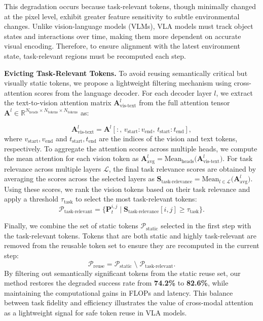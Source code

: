 This degradation occurs because task-relevant tokens, though minimally changed at the pixel level, exhibit greater feature sensitivity to subtle environmental changes. Unlike vision-language models (VLMs), VLA models must track object states and interactions over time, making them more dependent on accurate visual encoding. Therefore, to ensure alignment with the latest environment state, task-relevant regions must be recomputed each step.


\textbf{Evicting Task-Relevant Tokens.}
To avoid reusing semantically critical but visually static tokens, we propose a lightweight filtering mechanism using cross-attention scores from the language decoder. For each decoder layer \(l\), we extract the text-to-vision attention matrix \(\mathbf{A}^l_{\text{vis-text}}\) from the full attention tensor \(\mathbf{A}^l \in \mathbb{R}^{N_{\text{heads}} \times N_{\text{tokens}} \times N_{\text{tokens}}}\) as:

\begin{equation}
\label{eq:avistext}
\mathbf{A}^l_{\text{vis-text}} 
= \mathbf{A}^l[:,\, v_{\text{start}} : v_{\text{end}},\, t_{\text{start}} : t_{\text{end}}],
\end{equation}
where \( v_{\text{start}}, v_{\text{end}} \) and \( t_{\text{start}}, t_{\text{end}} \) are the indices of the vision and text tokens, respectively. To aggregate the attention scores across multiple heads, we compute the mean attention for each vision token as $\mathbf{A}^l_{\text{avg}} 
= \mathrm{Mean}_{\text{heads}}\!\bigl(\mathbf{A}^l_{\text{vis-text}}\bigr)$. For task relevance across multiple layers \( \mathcal{L} \), the final task relevance scores are obtained by averaging the scores across the selected layers as $\mathbf{S}_{\text{task-relevance}} 
= \mathrm{Mean}_{l \in \mathcal{L}}\!\bigl(\mathbf{A}^l_{\text{avg}}\bigr)$.
Using these scores, we rank the vision tokens based on their task relevance and apply a threshold \( \tau_{\text{task}} \) to select the most task-relevant tokens:
\begin{equation}
\label{eq:ptask}
\mathcal{P}_{\text{task-relevant}} 
= \{ \mathbf{P}_t^{i,j} \mid \mathbf{S}_{\text{task-relevance}}[i,j] \geq \tau_{\text{task}} \}.
\end{equation}

Finally, we combine the set of static tokens \( \mathcal{P}_{\mathrm{static}} \) selected in the first step with the task-relevant tokens. Tokens that are both static and highly task-relevant are removed from the reusable token set to ensure they are recomputed in the current step:
\begin{equation}
\label{eq:pfinal}
\mathcal{P}_{\mathrm{reuse}} 
= \mathcal{P}_{\mathrm{static}} \;\setminus\; \mathcal{P}_{\text{task-relevant}}.
\end{equation}
By filtering out semantically significant tokens from the static reuse set, our method restores the degraded success rate from \textbf{74.2\%} to \textbf{82.6\%}, while maintaining the computational gains in FLOPs and latency. This balance between task fidelity and efficiency illustrates the value of cross-modal attention as a lightweight signal for safe token reuse in VLA models.


